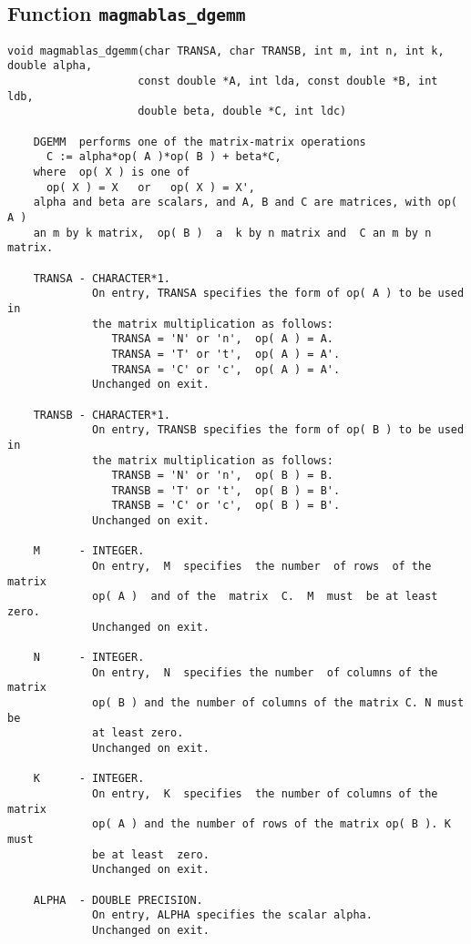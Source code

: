 \documentclass[10pt]{book}
\begin{document}
\subsection{Function {\tt {\bf magmablas\_dgemm}}}
\begin{verbatim}
void magmablas_dgemm(char TRANSA, char TRANSB, int m, int n, int k, double alpha,
                    const double *A, int lda, const double *B, int ldb, 
                    double beta, double *C, int ldc)
 
    DGEMM  performs one of the matrix-matrix operations
      C := alpha*op( A )*op( B ) + beta*C,
    where  op( X ) is one of
      op( X ) = X   or   op( X ) = X',
    alpha and beta are scalars, and A, B and C are matrices, with op( A )
    an m by k matrix,  op( B )  a  k by n matrix and  C an m by n matrix.
   
    TRANSA - CHARACTER*1.
             On entry, TRANSA specifies the form of op( A ) to be used in
             the matrix multiplication as follows:
                TRANSA = 'N' or 'n',  op( A ) = A.
                TRANSA = 'T' or 't',  op( A ) = A'.
                TRANSA = 'C' or 'c',  op( A ) = A'.
             Unchanged on exit.
 
    TRANSB - CHARACTER*1.
             On entry, TRANSB specifies the form of op( B ) to be used in
             the matrix multiplication as follows:
                TRANSB = 'N' or 'n',  op( B ) = B.
                TRANSB = 'T' or 't',  op( B ) = B'.
                TRANSB = 'C' or 'c',  op( B ) = B'.
             Unchanged on exit.
 
    M      - INTEGER.
             On entry,  M  specifies  the number  of rows  of the  matrix
             op( A )  and of the  matrix  C.  M  must  be at least  zero.
             Unchanged on exit.
 
    N      - INTEGER.
             On entry,  N  specifies the number  of columns of the matrix
             op( B ) and the number of columns of the matrix C. N must be
             at least zero.
             Unchanged on exit.
 
    K      - INTEGER.
             On entry,  K  specifies  the number of columns of the matrix
             op( A ) and the number of rows of the matrix op( B ). K must
             be at least  zero.
             Unchanged on exit.
 
    ALPHA  - DOUBLE PRECISION.
             On entry, ALPHA specifies the scalar alpha.
             Unchanged on exit.
 

\end{verbatim}
\end{document}
